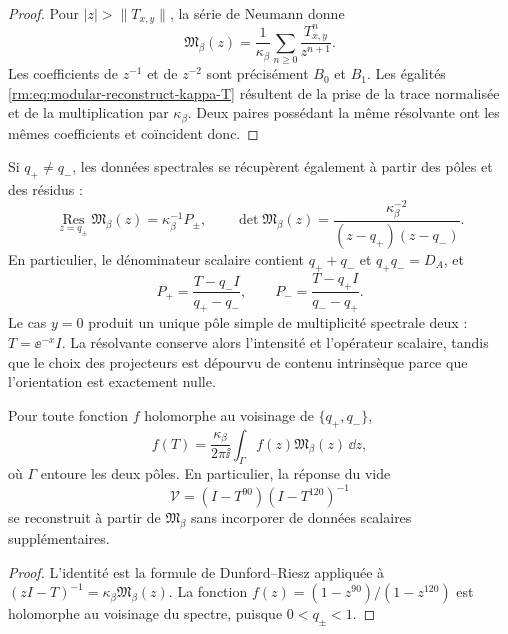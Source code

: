 \begin{proof}
Pour \(|z|>\lVert T_{x,y}\rVert\), la série de Neumann donne
\begin{equation}
 \mathfrak M_\beta(z)
 =\frac1{\kappa_\beta}
 \sum_{n\geq0}\frac{T_{x,y}^{n}}{z^{n+1}}.
 \label{rm:eq:modular-Laurent}
\end{equation}
Les coefficients de \(z^{-1}\) et de \(z^{-2}\) sont précisément \(B_0\) et \(B_1\). Les égalités \cref{rm:eq:modular-reconstruct-kappa-T} résultent de la prise de la trace normalisée et de la multiplication par \(\kappa_\beta\). Deux paires possédant la même résolvante ont les mêmes coefficients et coïncident donc.
\end{proof}

Si \(q_+\ne q_-\), les données spectrales se récupèrent également à partir des pôles et des résidus :
\begin{equation}
 \operatorname*{Res}_{z=q_\pm}\mathfrak M_\beta(z)
 =\kappa_\beta^{-1}P_\pm,
 \qquad
 \det\mathfrak M_\beta(z)
 =\frac{\kappa_\beta^{-2}}
 {(z-q_+)(z-q_-)}.
 \label{rm:eq:modular-resolvent-residues}
\end{equation}
En particulier, le dénominateur scalaire contient \(q_++q_-\) et \(q_+q_-=D_A\), et
\begin{equation}
 P_+=\frac{T-q_-I}{q_+-q_-},
 \qquad
 P_-=\frac{T-q_+I}{q_--q_+}.
 \label{rm:eq:modular-projector-recovery}
\end{equation}
Le cas \(y=0\) produit un unique pôle simple de multiplicité spectrale deux : \(T=\ee^{-x}I\). La résolvante conserve alors l’intensité et l’opérateur scalaire, tandis que le choix des projecteurs est dépourvu de contenu intrinsèque parce que l’orientation est exactement nulle.

\begin{corollary}
\label{rm:cor:modular-functional-calculus} Pour toute fonction \(f\) holomorphe au voisinage de \(\{q_+,q_-\}\),
\begin{equation}
 f(T)=\frac{\kappa_\beta}{2\pi\ii}
 \int_\Gamma f(z)\mathfrak M_\beta(z)\,\dd z,
 \label{rm:eq:modular-Dunford}
\end{equation}
où \(\Gamma\) entoure les deux pôles. En particulier, la réponse du vide
\[
 \mathcal V=(I-T^{90})(I-T^{120})^{-1}
\]
se reconstruit à partir de \(\mathfrak M_\beta\) sans incorporer de données scalaires supplémentaires.
\end{corollary}

\begin{proof}
L’identité est la formule de Dunford--Riesz appliquée à \((zI-T)^{-1}=\kappa_\beta\mathfrak M_\beta(z)\). La fonction \(f(z)=(1-z^{90})/(1-z^{120})\) est holomorphe au voisinage du spectre, puisque \(0<q_\pm<1\).
\end{proof}

